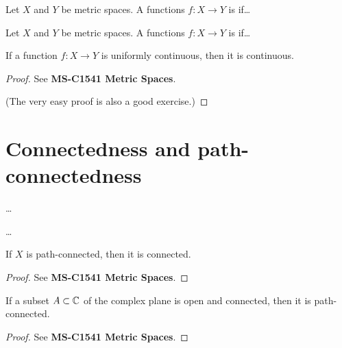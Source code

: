 \begin{definition}[Continuity]
  \label{def:continuous}
  Let $X$ and $Y$ be metric spaces.
  A functions $f \colon X \to Y$ is  if\ldots
\end{definition}

\begin{definition}
  \label{def:uniformly_continuous}
  Let $X$ and $Y$ be metric spaces.
  A functions $f \colon X \to Y$ is  if\ldots
\end{definition}

\begin{lemma}
  \label{lem:uniformly_continuous_implies_continuous}
  \lean{}
  If a function $f \colon X \to Y$ is uniformly continuous, then it is continuous.
\end{lemma}
\begin{proof}
  See \textbf{MS-C1541 Metric Spaces}.

  (The very easy proof is also a good exercise.)
\end{proof}

\section{Connectedness and path-connectedness}

\begin{definition}[Connectedness]
  \label{def:connected}
  \ldots
\end{definition}

\begin{definition}
  \label{def:path_connected}
  \ldots
\end{definition}

\begin{lemma}
  \label{lem:path_connected_implies_connected}
  \lean{}
  If $X$ is path-connected, then it is connected.
\end{lemma}
\begin{proof}
  See \textbf{MS-C1541 Metric Spaces}.
\end{proof}

\begin{lemma}
  \label{lem:connected_open_implies_path_connected}
  \lean{}
  If a subset $A \subset \mathbb{C}$ of the complex plane is open
  and connected, then it is path-connected.
\end{lemma}
\begin{proof}
  See \textbf{MS-C1541 Metric Spaces}.
\end{proof}

